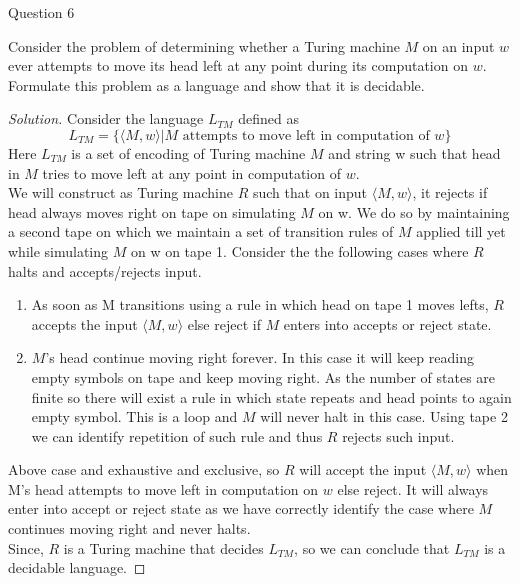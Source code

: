 \begin{solution}{Question 6}\label{ques:6}
    \begin{question}
        Consider the problem of determining whether a Turing machine $M$ on an input $w$ ever attempts to move its head left at any point during its computation on $w$. Formulate this problem as a language and show that it is decidable.
    \end{question}
    \tcblower{}
    \begin{proof}[Solution]
        Consider the language $L_{TM}$ defined as
        \[L_{TM} = \{\langle M, w\rangle  | M \text{ attempts to move left in computation of } w\}\]
        Here $L_{TM}$ is a set of encoding of Turing machine $M$ and string w such that head in $M$ tries to move left at any point in computation of $w$.
        \\    
        We will construct as Turing machine $R$ such that on input $\langle M, w\rangle $, it rejects if head always moves right on tape on simulating $M$ on w. We do so by maintaining a second tape on which we maintain a set of transition rules of $M$ applied till yet while simulating $M$ on w on tape 1. Consider the the following cases where $R$ halts and accepts/rejects input.
        \begin{enumerate}
            \item As soon as M transitions using a rule in which head on tape 1 moves lefts, $R$ accepts the input $\langle M, w\rangle $ else reject if $M$ enters into accepts or reject state.
            \item $M$'s head continue moving right forever. In this case it will keep reading empty symbols on tape and keep moving right. As the number of states are finite so there will exist a rule in which state repeats and head points to again empty symbol. This is a loop and $M$ will never halt in this case. Using tape 2 we can identify repetition of such rule and thus $R$ rejects such input.
        \end{enumerate}
        Above case and exhaustive and exclusive, so $R$ will accept the input $\langle M, w\rangle $ when M's head attempts to move left in computation on $w$ else reject. It will always enter into accept or reject state as we have correctly identify the case where $M$ continues moving right and never halts.
        \\
        Since, $R$ is a Turing machine that decides $L_{TM}$, so we can conclude that $L_{TM}$ is a decidable language.
    \end{proof}
\end{solution}

